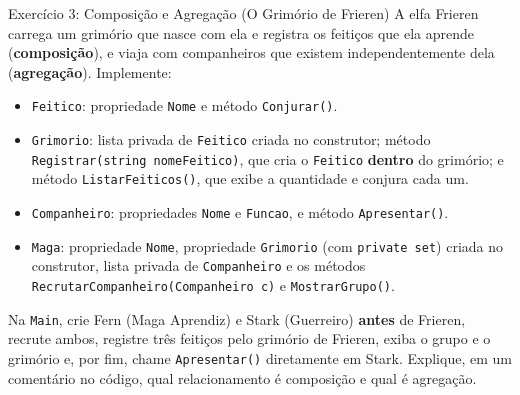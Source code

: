\begin{exercicio}{Exercício 3: Composição e Agregação (O Grimório de Frieren)}
A elfa Frieren carrega um grimório que nasce com ela e registra os feitiços que ela aprende
(\textbf{composição}), e viaja com companheiros que existem independentemente dela
(\textbf{agregação}). Implemente:
\begin{itemize}
    \item \texttt{Feitico}: propriedade \texttt{Nome} e método \texttt{Conjurar()}.
    \item \texttt{Grimorio}: lista privada de \texttt{Feitico} criada no construtor; método
    \texttt{Registrar(string nomeFeitico)}, que cria o \texttt{Feitico} \textbf{dentro} do
    grimório; e método \texttt{ListarFeiticos()}, que exibe a quantidade e conjura cada um.
    \item \texttt{Companheiro}: propriedades \texttt{Nome} e \texttt{Funcao}, e método
    \texttt{Apresentar()}.
    \item \texttt{Maga}: propriedade \texttt{Nome}, propriedade \texttt{Grimorio} (com
    \texttt{private set}) criada no construtor, lista privada de \texttt{Companheiro} e os
    métodos \texttt{RecrutarCompanheiro(Companheiro c)} e \texttt{MostrarGrupo()}.
\end{itemize}
Na \texttt{Main}, crie Fern (Maga Aprendiz) e Stark (Guerreiro) \textbf{antes} de Frieren,
recrute ambos, registre três feitiços pelo grimório de Frieren, exiba o grupo e o grimório e,
por fim, chame \texttt{Apresentar()} diretamente em Stark. Explique, em um comentário no código,
qual relacionamento é composição e qual é agregação.
\end{exercicio}

